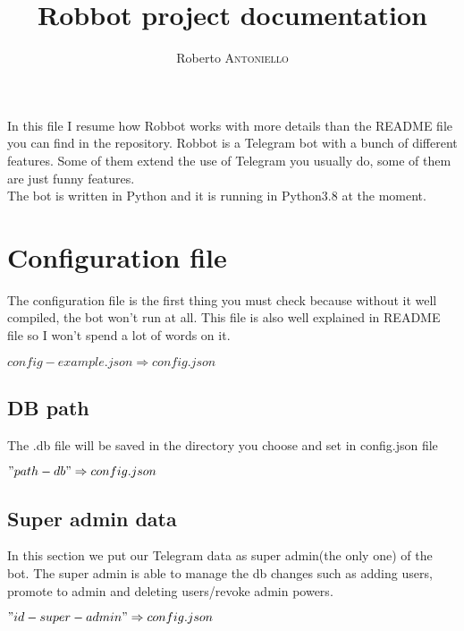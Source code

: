 \documentclass{article}
\title{Robbot project documentation} %
\author{Roberto \textsc{Antoniello}} %
\begin{document}
\maketitle %

\begin{center} In this file I resume how Robbot works with more details than the README file you can find in the repository.
Robbot is a Telegram bot with a bunch of different features. Some of them extend the use of Telegram you usually do, some of them are just funny features.\\
The bot is written in Python and it is running in Python3.8 at the moment.\end{center}

\section{Configuration file}

The configuration file is the first thing you must check because without it well compiled, the bot won't run at all. This file is also well explained in README file so I won't spend a lot of words on it.
\begin{center} $config-example.json \Rightarrow config.json$ \end{center}

\subsection{DB path}
The .db file will be saved in the directory you choose and set in config.json file
\begin{center} $"path-db" \Rightarrow config.json$ \end{center}

\subsection{Super admin data}
In this section we put our Telegram data as super admin(the only one) of the bot. The super admin is able to manage the db changes such as adding users, promote to admin and deleting users/revoke admin powers.
\begin{center} $"id-super-admin" \Rightarrow config.json$ \end{center}
\end{document}
